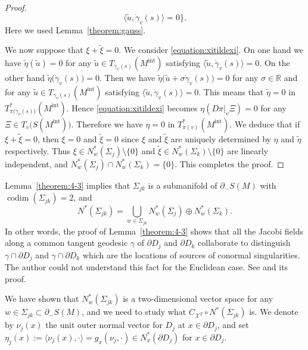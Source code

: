 \documentclass[a4paper,11pt,reqno]{amsart}
\numberwithin{equation}{section}
\theoremstyle{definition}
\theoremstyle{remark}
\begin{document}
\begin{proof}
$$\langle{\tilde{u},\dot{\gamma}_v(s)}\rangle=0
\}. 
$$
%
%
Here we used Lemma~\ref{theorem:gauss}. 
%
%
\par
%
%
We now suppose that $\xi+\tilde{\xi}=0$. 
We consider \eqref{equation:xitildexi}. 
On one hand  we have $\tilde{\eta}(\tilde{u})=0$ 
for any $\tilde{u} \in T_{\gamma_v(s)}(M^\text{int})$ satisfying $\langle{\tilde{u},\dot{\gamma}_v(s)}\rangle=0$. 
On the other hand $\tilde{\eta}\bigl(\dot{\gamma}_v(s)\bigr)=0$. 
Then we have $\tilde{\eta}\bigl(\tilde{u}+\sigma\dot{\gamma}_v(s)\bigr)=0$ 
for any $\sigma\in\mathbb{R}$ and 
for any $\tilde{u} \in T_{\gamma_v(s)}(M^\text{int})$ satisfying $\langle{\tilde{u},\dot{\gamma}_v(s)}\rangle=0$. 
This means that $\tilde{\eta}=0$ in $T^\ast_{\pi\bigl(\dot{\gamma}_v(s)\bigr)}(M^\text{int})$. 
Hence \eqref{equation:xitildexi} becomes $\eta(D\pi\vert_v\Xi)=0$ for any $\Xi \in T_v\bigl(S(M^\text{int})\bigr)$. 
Therefore we have $\eta=0$ in $T^\ast_{\pi(v)}(M^\text{int})$. 
We deduce that if $\xi+\tilde{\xi}=0$, then $\xi=0$ and $\tilde{\xi}=0$ 
since $\xi$ and $\tilde{\xi}$ are uniquely determined by $\eta$ and $\tilde{\eta}$ respectively. 
Thus $\xi \in N^\ast_w(\Sigma_j)\setminus\{0\}$ and $\tilde{\xi} \in N^\ast_w(\Sigma_k)\setminus\{0\}$ 
are linearly independent, and $N^\ast_w(\Sigma_j){\cap}N^\ast_w(\Sigma_k)=\{0\}$. This completes the proof. 
\end{proof}
%
%
Lemma~\ref{theorem:4-3} implies that $\Sigma_{jk}$ is a submanifold of $\partial_-S(M)$ with 
$\operatorname{codim}(\Sigma_{jk})=2$, and 
%
%
$$
N^\ast(\Sigma_{jk})
=
\bigcup_{w \in \Sigma_{jk}}
N^\ast_w(\Sigma_j) \oplus N^\ast_w(\Sigma_k). 
$$
%
%
In other words, the proof of Lemma~\ref{theorem:4-3} shows that all the Jacobi fields along a common tangent geodesic $\gamma$ of $\partial{D}_j$ and $\partial{D_k}$ collaborate to distinguish $\gamma{\cap}\partial{D_j}$ and $\gamma{\cap}\partial{D_k}$ which are the locations of sources of conormal singularities. The author could not understand this fact for the Euclidean case. See \cite[Lemma~4.2]{Chihara} and its proof. 
%
%
\par
%
%
We have shown that $N_w^\ast(\Sigma_{jk})$ is a two-dimensional vector space for any $w \in \Sigma_{jk} \subset \partial_-S(M)$, 
and we need to study what $C_{\mathcal{X}^T}{\circ}N^\ast(\Sigma_{jk})$ is. 
We denote by $\nu_j(x)$ the unit outer normal vector for $D_j$ at $x \in \partial{D_j}$, and set 
$\eta_j(x):=\langle\nu_j(x),\cdot\rangle=g_x(\nu_j,\cdot) \in N^\ast_x(\partial{D_j})$ for $x \in \partial{D_j}$. 
%
%
\par
\end{document}
